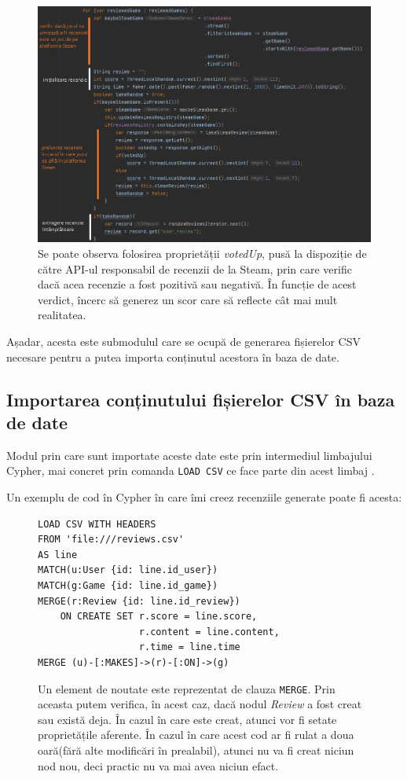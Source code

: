 \documentclass[12pt,a4paper]{report}
\begin{document}
\begin{figure}[H]
\centering
\caption{}
\includegraphics[scale = 0.7]{exemplu_14_review_code_java}
\caption*{Se poate observa folosirea proprietății \emph{votedUp}, pusă la dispoziție de către API-ul responsabil de recenzii de la Steam, prin care verific dacă acea recenzie a fost pozitivă sau negativă. În funcție de acest verdict, încerc să generez un scor care să reflecte cât mai mult realitatea.}
\end{figure}

Așadar, acesta este submodulul care se ocupă de generarea fișierelor CSV necesare pentru a putea importa conținutul acestora în baza de date.

\subsection{Importarea conținutului fișierelor CSV în baza de date}

Modul prin care sunt importate aceste date este prin intermediul limbajului Cypher, mai concret prin comanda \texttt{LOAD CSV} ce face parte din acest limbaj \cite{18}.

Un exemplu de cod în Cypher în care îmi creez recenziile generate poate fi acesta:

\begin{figure}[H]
\centering
\begin{BVerbatim}
LOAD CSV WITH HEADERS
FROM 'file:///reviews.csv'
AS line
MATCH(u:User {id: line.id_user})
MATCH(g:Game {id: line.id_game})
MERGE(r:Review {id: line.id_review})
    ON CREATE SET r.score = line.score,
                  r.content = line.content,
                  r.time = line.time
MERGE (u)-[:MAKES]->(r)-[:ON]->(g)
\end{BVerbatim}
\caption*{Un element de noutate este reprezentat de clauza \texttt{MERGE}. Prin aceasta putem verifica, în acest caz, dacă nodul \emph{Review} a fost creat sau există deja. În cazul în care este creat, atunci vor fi setate proprietățile aferente. În cazul în care acest cod ar fi rulat a doua oară(fără alte modificări în prealabil), atunci nu va fi creat niciun nod nou, deci practic nu va mai avea niciun efact.}
\end{figure}
\end{document}
